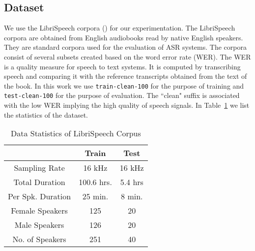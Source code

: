 \subsection{Dataset}
We use the LibriSpeech corpora (\cite{panayotov2015librispeech}) for our experimentation. The LibriSpeech corpora are obtained from English audiobooks read by native English speakers. They are standard corpora used for the evaluation of ASR systems. The corpora consist of several subsets created based on the word error rate (WER). The WER is a quality measure for speech to text systems. It is computed by transcribing speech and comparing it with the reference transcripts obtained from the text of the book. In this work we use \texttt{train-clean-100} for the purpose of training and \texttt{test-clean-100} for the purpose of evaluation. The ``clean" suffix is associated with the low WER implying the high quality of speech signals. 
In Table~\ref{tab:data_stat} we list the statistics of the dataset. 

\begin{table}[]
    \centering
    \begin{tabular}{ccc}
    \toprule
        & \textbf{Train} & \textbf{Test} \\
    \midrule
        Sampling Rate & 16 kHz & 16 kHz\\
        Total Duration &  100.6 hrs. & 5.4 hrs\\
        Per Spk. Duration & 25 min. & 8 min.\\
        Female Speakers & 125 & 20\\
        Male Speakers & 126 & 20\\
        No. of Speakers & 251 & 40\\
    \bottomrule
    \end{tabular}
    \caption{Data Statistics of LibriSpeech Corpus}
    \label{tab:data_stat}
\end{table}



